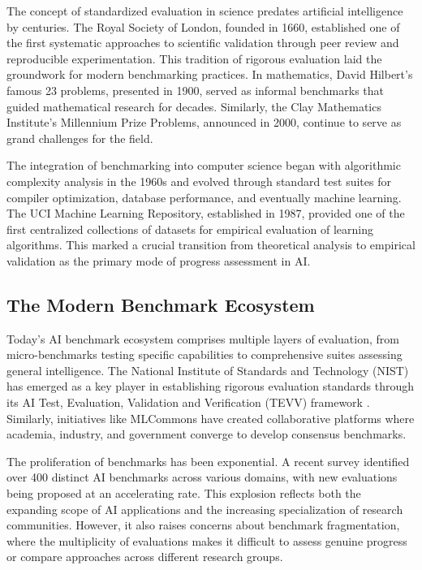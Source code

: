 \documentclass[10pt,twocolumn]{article}
\begin{document}
The concept of standardized evaluation in science predates artificial intelligence by centuries. The Royal Society of London, founded in 1660, established one of the first systematic approaches to scientific validation through peer review and reproducible experimentation. This tradition of rigorous evaluation laid the groundwork for modern benchmarking practices. In mathematics, David Hilbert's famous 23 problems, presented in 1900, served as informal benchmarks that guided mathematical research for decades. Similarly, the Clay Mathematics Institute's Millennium Prize Problems, announced in 2000, continue to serve as grand challenges for the field.

The integration of benchmarking into computer science began with algorithmic complexity analysis in the 1960s and evolved through standard test suites for compiler optimization, database performance, and eventually machine learning. The UCI Machine Learning Repository, established in 1987, provided one of the first centralized collections of datasets for empirical evaluation of learning algorithms. This marked a crucial transition from theoretical analysis to empirical validation as the primary mode of progress assessment in AI.

\subsection{The Modern Benchmark Ecosystem}

Today's AI benchmark ecosystem comprises multiple layers of evaluation, from micro-benchmarks testing specific capabilities to comprehensive suites assessing general intelligence. The National Institute of Standards and Technology (NIST) has emerged as a key player in establishing rigorous evaluation standards through its AI Test, Evaluation, Validation and Verification (TEVV) framework \cite{nist2025}. Similarly, initiatives like MLCommons have created collaborative platforms where academia, industry, and government converge to develop consensus benchmarks.

The proliferation of benchmarks has been exponential. A recent survey identified over 400 distinct AI benchmarks across various domains, with new evaluations being proposed at an accelerating rate. This explosion reflects both the expanding scope of AI applications and the increasing specialization of research communities. However, it also raises concerns about benchmark fragmentation, where the multiplicity of evaluations makes it difficult to assess genuine progress or compare approaches across different research groups.
\end{document}
